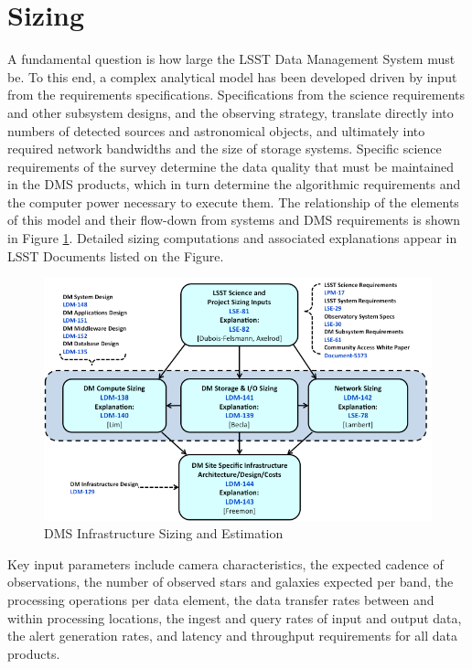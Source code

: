 \section{Sizing}\label{sizing}

A fundamental question is how large the LSST Data Management System must be. To
this end, a complex analytical model has been developed driven by input from
the requirements specifications. Specifications from the science requirements
and other subsystem designs, and the observing strategy, translate directly
into numbers of detected sources and astronomical objects, and ultimately into
required network bandwidths and the size of storage systems. Specific science
requirements of the survey determine the data quality that must be maintained
in the DMS products, which in turn determine the algorithmic requirements and
the computer power necessary to execute them. The relationship of the elements
of this model and their flow-down from systems and DMS requirements is shown in
Figure \ref{fig:sizing-model}. Detailed sizing computations and associated
explanations appear in LSST Documents listed on the Figure.

\begin{figure}
\centering
\includegraphics[width=\textwidth]{SizingModel.png}
\caption{DMS Infrastructure Sizing and Estimation}
\label{fig:sizing-model}
\end{figure}

Key input parameters include camera characteristics, the expected cadence of
observations, the number of observed stars and galaxies expected per band, the
processing operations per data element, the data transfer rates between and
within processing locations, the ingest and query rates of input and output
data, the alert generation rates, and latency and throughput requirements for
all data products.

